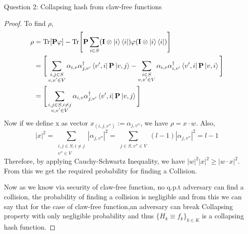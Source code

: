 \begin{solution}{Question 2: Collapsing hash from claw-free functions}
\begin{proof}
    To find $\rho$, 
    \begin{equation*}
        \begin{split}
            \rho &= \text{Tr}[\textbf{P}\varphi] - \text{Tr}\Bigg[\textbf{P}\sum_{i\in S}(\textbf{I}\otimes \ket{i}\bra{i})\varphi(\textbf{I}\otimes \ket{i}\bra{i})\Bigg]\\
            &= \Bigg[\sum\limits_{\substack{i,j\in S \\ v,v'\in V}} \alpha_{i,v}\alpha_{j,v'}^\dag \bra{v',i}\textbf{P}\ket{v,j} - \sum\limits_{\substack{i\in S \\ v,v'\in V}} \alpha_{i,v}\alpha_{i,v'}^\dag \bra{v',i}\textbf{P}\ket{v,i}\Bigg]\\
            &= \Bigg[\sum\limits_{\substack{i,j\in S, i\neq j \\ v,v'\in V}} \alpha_{i,v}\alpha_{j,v'}^\dag \bra{v',i}\textbf{P}\ket{v,j} \Bigg]
        \end{split}
    \end{equation*}
    Now if we define x as vector $x_(i,j,v'') := \alpha_{j,v''}$, we have $\rho = x\cdot w$. Also,
    \begin{equation*}
        |x|^2 = \sum\limits_{\substack{i,j\in S,i\neq j \\ v''\in V}} |\alpha_{j,v''}|^2 = \sum\limits_{\substack{j\in S, v''\in V}} (l-1) |\alpha_{j,v''}|^2 = l-1
    \end{equation*}
    Therefore, by applying Cauchy-Schwartz Inequality, we have $|w|^2|x|^2 \geq |w\cdot x|^2$. From this we get the required probability for finding a Collision.

    Now as we know via security of claw-free function, no q.p.t adversary can find a collision, the probability of finding a collision is negligible and from this we can say that for the case of claw-free function,an adversary can break Collapsing property with only negligible probability and thus $\{H_k \equiv f_k\}_{k\in K}$ is a collapsing hash function.
    \end{proof}
\end{solution}
